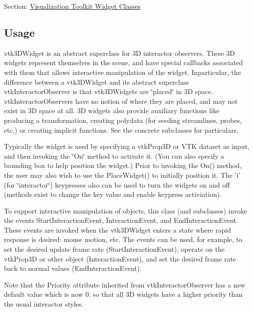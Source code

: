 Section\-: \hyperlink{sec_vtkwidgets}{Visualization Toolkit Widget Classes} \hypertarget{vtkwidgets_vtkxyplotwidget_Usage}{}\subsection{Usage}\label{vtkwidgets_vtkxyplotwidget_Usage}
vtk3\-D\-Widget is an abstract superclass for 3\-D interactor observers. These 3\-D widgets represent themselves in the scene, and have special callbacks associated with them that allows interactive manipulation of the widget. Inparticular, the difference between a vtk3\-D\-Widget and its abstract superclass vtk\-Interactor\-Observer is that vtk3\-D\-Widgets are \char`\"{}placed\char`\"{} in 3\-D space. vtk\-Interactor\-Observers have no notion of where they are placed, and may not exist in 3\-D space at all. 3\-D widgets also provide auxiliary functions like producing a transformation, creating polydata (for seeding streamlines, probes, etc.) or creating implicit functions. See the concrete subclasses for particulars.

Typically the widget is used by specifying a vtk\-Prop3\-D or V\-T\-K dataset as input, and then invoking the \char`\"{}\-On\char`\"{} method to activate it. (You can also specify a bounding box to help position the widget.) Prior to invoking the On() method, the user may also wish to use the Place\-Widget() to initially position it. The 'i' (for \char`\"{}interactor\char`\"{}) keypresses also can be used to turn the widgets on and off (methods exist to change the key value and enable keypress activiation).

To support interactive manipulation of objects, this class (and subclasses) invoke the events Start\-Interaction\-Event, Interaction\-Event, and End\-Interaction\-Event. These events are invoked when the vtk3\-D\-Widget enters a state where rapid response is desired\-: mouse motion, etc. The events can be used, for example, to set the desired update frame rate (Start\-Interaction\-Event), operate on the vtk\-Prop3\-D or other object (Interaction\-Event), and set the desired frame rate back to normal values (End\-Interaction\-Event).

Note that the Priority attribute inherited from vtk\-Interactor\-Observer has a new default value which is now 0. so that all 3\-D widgets have a higher priority than the usual interactor styles.

